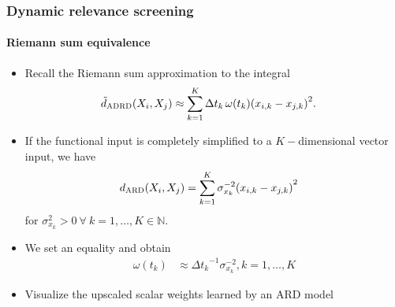 \documentclass{snedecorbeamer}
\begin{document}
\begin{frame}%
  \label{frm:upscaled-weights}
  \frametitle{Dynamic relevance screening}
  \framesubtitle{Riemann sum equivalence}

  \begin{itemize}
  \item Recall the Riemann sum approximation to the integral
    \begin{align}
      \tilde{d}_{\textsc{ADRD}}(X_i, X_j)
      &\approx \sum_{k=1}^{K} \Delta t_k\,\omega(t_k) {(x_{i,k} - x_{j,k})}^2.
    \end{align}
  \item If the functional input is completely simplified to a $K-$dimensional
    vector input, we have
    \begin{align}
      \label{eq:01-adrd-ard-norm}
      d_{\textsc{ARD}}(X_i, X_j)
      &= \sum_{k = 1}^{K}{\sigma_{x_k}^{-2}(x_{i,k} - x_{j, k})}^2
    \end{align}
    for $\sigma_{x_k}^2 > 0 \ \forall \ k = 1, \dots, K \in \mathbb{N}$.
  \item We set an equality and obtain
    \begin{align}
      \omega(t_k)
      &\approx {\Delta t_k}^{-1} \sigma^{-2}_{x_k}, k = 1,\dots, K
    \end{align}
  \item Visualize the upscaled scalar weights learned by an \textsc{ARD} model
  \end{itemize}
\end{frame}
\end{document}
